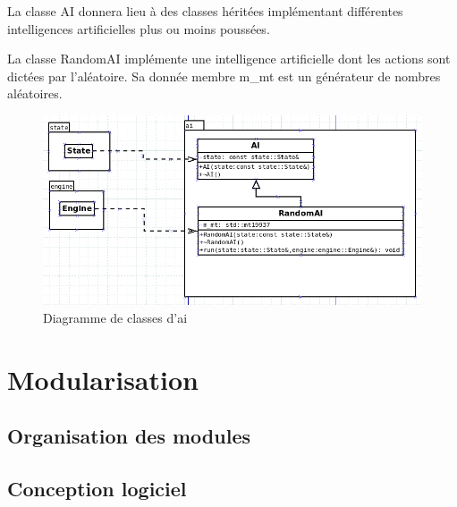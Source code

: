 \documentclass[a4paper,12pt]{article}
\begin{document}
La classe AI donnera lieu à des classes héritées implémentant différentes intelligences artificielles plus ou moins poussées.

La classe RandomAI implémente une intelligence artificielle dont les actions sont dictées par l'aléatoire. Sa donnée membre m\_mt est un générateur de nombres aléatoires.

\begin{figure}[hbt!]
    \centering
    \includegraphics[width =.8\paperwidth, angle=0]{images/ai.png}
    \caption{Diagramme de classes d'ai}
    \label{fig:randomai}
\end{figure}


\clearpage
\section{Modularisation}
\label{sec:module}

\subsection{Organisation des modules}


\subsection{Conception logiciel}


%
\end{document}
